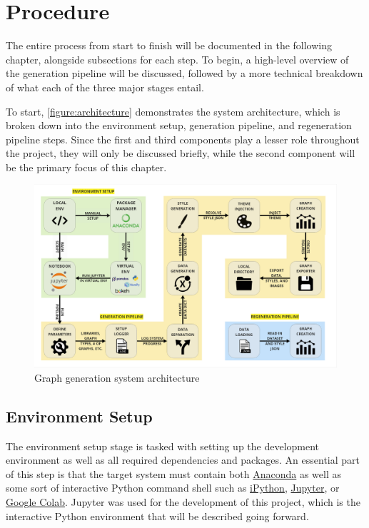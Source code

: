\chapter{Procedure}

The entire process from start to finish will be documented in the following chapter, alongside subsections for each step. To begin, a high-level overview of the generation pipeline will be discussed, followed by a more technical breakdown of what each of the three major stages entail. 

\hfill

To start, \autoref{figure:architecture} demonstrates the system architecture, which is broken down into the environment setup, generation pipeline, and regeneration pipeline steps. Since the first and third components play a lesser role throughout the project, they will only be discussed briefly, while the second component will be the primary focus of this chapter.

\hfill

\begin{figure}[hbt]
  \centering
  \includegraphics[width=\textwidth,height=\textheight,keepaspectratio]{figures/body/procedure/architecture_diagram}
  \caption{Graph generation system architecture}
\label{figure:architecture}
\end{figure}

\section{Environment Setup}

The environment setup stage is tasked with setting up the development environment as well as all required dependencies and packages. An essential part of this step is that the target system must contain both
\href{https://www.anaconda.com/}{Anaconda} as well as some sort of interactive Python command shell such as \href{https://ipython.org/}{iPython}, \href{https://jupyter.org/}{Jupyter}, or \href{https://research.google.com/colaboratory/}{Google Colab}. Jupyter was used for the development of this project, which is the interactive Python environment that will be described going forward. 


